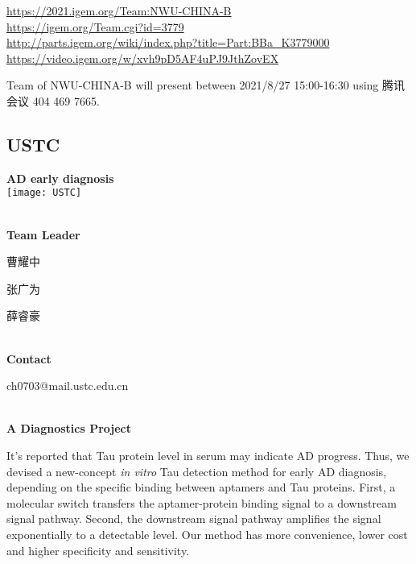 \url{https://2021.igem.org/Team:NWU-CHINA-B }\\
\url{https://igem.org/Team.cgi?id=3779 }\\
\url{http://parts.igem.org/wiki/index.php?title=Part:BBa_K3779000 }\\
\url{https://video.igem.org/w/xvh9pD5AF4uPJ9JthZovEX }\\

\vfill{}









Team of NWU-CHINA-B will present between  2021/8/27 15:00-16:30       using 腾讯会议 404 469 7665.
\newpage


\subsection{\textcolor{Blu}{ USTC } }
\vspace{5mm}
\begin{center}
\large{
  \textbf{ AD early diagnosis }\\

  \texttt{[image: USTC]}
}
\end{center}
\textbf{\\Team Leader}

  曹耀中

  张广为

  薛睿豪


\textbf{\\Contact}

  ch0703@mail.ustc.edu.cn


\textbf{\\A Diagnostics Project\\}\begin{spacing}{1.5}

It’s reported that Tau protein level in serum may indicate AD progress. Thus, we devised a new-concept \textit{in vitro} Tau detection method for early AD diagnosis, depending on the specific binding between aptamers and Tau proteins. First, a molecular switch transfers the aptamer-protein binding signal to a downstream signal pathway. Second, the downstream signal pathway amplifies the signal exponentially to a detectable level. Our method has more convenience, lower cost and higher specificity and sensitivity.\end{spacing}
\\

